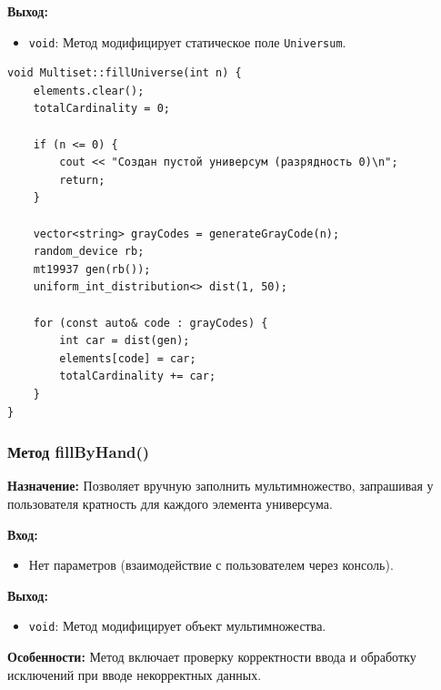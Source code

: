 \textbf{Выход:}
\begin{itemize}
    \item \texttt{void}: Метод модифицирует статическое поле \texttt{Universum}.
\end{itemize}

\begin{lstlisting}[style=cstyle, caption={Реализация fillUniverse()}]
void Multiset::fillUniverse(int n) {
    elements.clear();
    totalCardinality = 0;

    if (n <= 0) {
        cout << "Создан пустой универсум (разрядность 0)\n";
        return;
    }

    vector<string> grayCodes = generateGrayCode(n);
    random_device rb;
    mt19937 gen(rb());
    uniform_int_distribution<> dist(1, 50);

    for (const auto& code : grayCodes) {
        int car = dist(gen);
        elements[code] = car;
        totalCardinality += car;
    }
}
\end{lstlisting}

\subsubsection{Метод fillByHand()}

\textbf{Назначение:} Позволяет вручную заполнить мультимножество, запрашивая у пользователя кратность для каждого элемента универсума.

\textbf{Вход:} 
\begin{itemize}
    \item Нет параметров (взаимодействие с пользователем через консоль).
\end{itemize}

\textbf{Выход:}
\begin{itemize}
    \item \texttt{void}: Метод модифицирует объект мультимножества.
\end{itemize}

\textbf{Особенности:} Метод включает проверку корректности ввода и обработку исключений при вводе некорректных данных.

